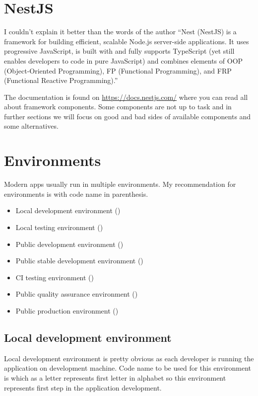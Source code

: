     \section{NestJS}\label{sec:nestjs}

    I couldn't explain it better than the words of the author ``Nest (NestJS) is a framework for building
    efficient, scalable Node.js server-side applications.
    It uses progressive JavaScript, is built with and fully supports
    TypeScript (yet still enables developers to code in pure JavaScript)
    and combines elements of OOP (Object-Oriented Programming),
    FP (Functional Programming), and FRP (Functional Reactive Programming).''

    The documentation is found on \href{https://docs.nestjs.com/}{https://docs.nestjs.com/} where you can
    read all about framework components.
    Some components are not up to task and in further sections we will focus on good and bad
    sides of available components and some alternatives.


    \section{Environments}\label{sec:environments}
    Modern apps usually run in multiple environments.
    My recommendation for environments is with code name in parenthesis.

    \begin{itemize}
        \item Local development environment ()
        \item Local testing environment ()
        \item Public development environment ()
        \item Public stable development environment ()
        \item CI testing environment ()
        \item Public quality assurance environment ()
        \item Public production environment ()
    \end{itemize}

    \subsection{Local development environment}\label{subsec:local-development-environment}
    Local development environment is pretty obvious as each developer is running the application on development machine.
    Code name to be used for this environment is  which as a letter represents first letter in alphabet
    so this environment represents first step in the application development.

